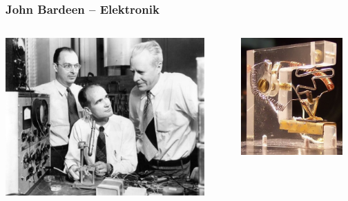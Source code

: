 \documentclass[14pt]{beamer}
\begin{document}
\begin{frame}
	\frametitle{John Bardeen -- Elektronik}
	\begin{center}
		\begin{columns}
			\begin{column}{0.5\textwidth}
		\includegraphics[width=0.9\textwidth]{john_bardeen.jpg}
			\end{column}
			\begin{column}{0.5\textwidth}
		\includegraphics[width=0.9\textwidth]{john_bardeen_transistor.jpg}
			\end{column}
		\end{columns}
	\end{center}
\end{frame}
\end{document}
